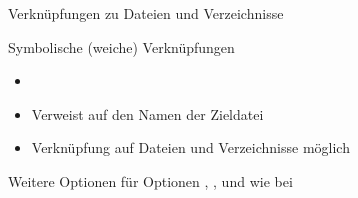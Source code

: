 \documentclass[aspectratio=43]{beamer}
\begin{document}
\begin{frame}{Verknüpfungen zu Dateien und Verzeichnisse}
  \begin{block}{Symbolische (weiche) Verknüpfungen}
    \begin{itemize}
      \item {}
      \item Verweist auf den Namen der Zieldatei
      \item Verknüpfung auf Dateien und Verzeichnisse möglich
    \end{itemize}
  \end{block}
  \begin{block}{Weitere Optionen für }
    Optionen , ,  und  wie bei 
  \end{block}
\end{frame}
\end{document}
